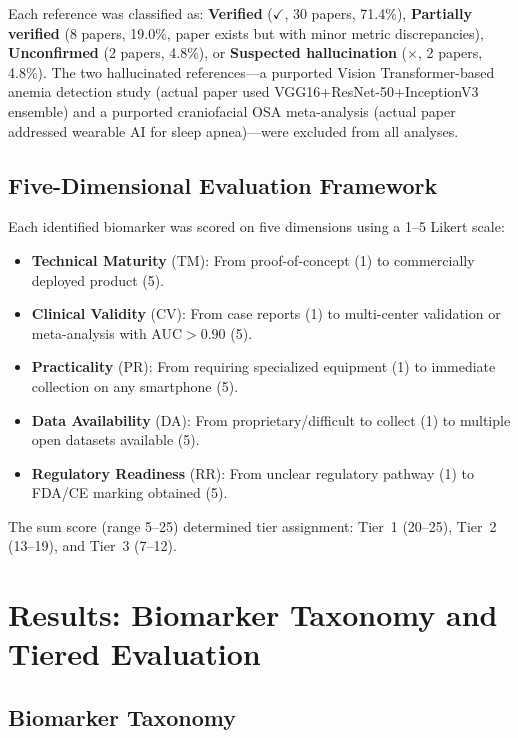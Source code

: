 \documentclass[conference]{IEEEtran}
\begin{document}
Each reference was classified as: \textbf{Verified} ($\checkmark$, 30 papers, 71.4\%), \textbf{Partially verified} (8 papers, 19.0\%, paper exists but with minor metric discrepancies), \textbf{Unconfirmed} (2 papers, 4.8\%), or \textbf{Suspected hallucination} ($\times$, 2 papers, 4.8\%). The two hallucinated references---a purported Vision Transformer-based anemia detection study (actual paper used VGG16+ResNet-50+InceptionV3 ensemble) and a purported craniofacial OSA meta-analysis (actual paper addressed wearable AI for sleep apnea)---were excluded from all analyses.

\subsection{Five-Dimensional Evaluation Framework}

Each identified biomarker was scored on five dimensions using a 1--5 Likert scale:

\begin{itemize}
\item \textbf{Technical Maturity} (TM): From proof-of-concept (1) to commercially deployed product (5).
\item \textbf{Clinical Validity} (CV): From case reports (1) to multi-center validation or meta-analysis with AUC$>$0.90 (5).
\item \textbf{Practicality} (PR): From requiring specialized equipment (1) to immediate collection on any smartphone (5).
\item \textbf{Data Availability} (DA): From proprietary/difficult to collect (1) to multiple open datasets available (5).
\item \textbf{Regulatory Readiness} (RR): From unclear regulatory pathway (1) to FDA/CE marking obtained (5).
\end{itemize}

The sum score (range 5--25) determined tier assignment: Tier~1 (20--25), Tier~2 (13--19), and Tier~3 (7--12).

\section{Results: Biomarker Taxonomy and Tiered Evaluation}

\subsection{Biomarker Taxonomy}
\end{document}
